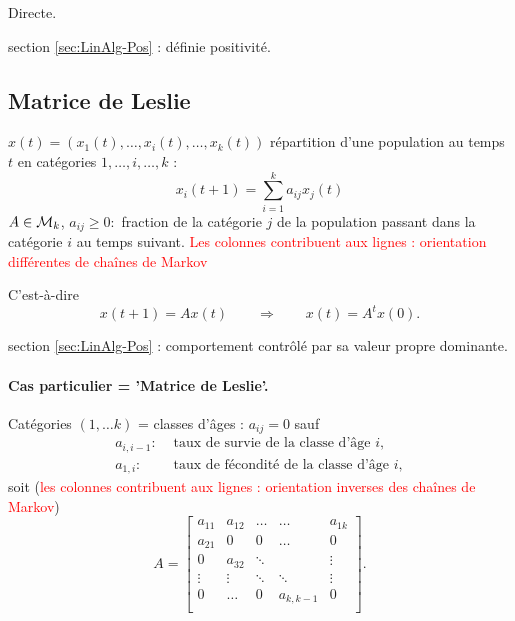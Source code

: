 \proof Directe. \eproof

\remark section \ref{sec:LinAlg-Pos} : définie positivité.

\subsection{Matrice de Leslie}  \label{sec:MatLeslie}

$x(t) = (x_1(t), \dots, x_i(t), \dots, x_k(t))$ répartition d'une population au temps $t$ en catégories $1, \dots, i, \dots, k$ :
$$
x_i(t+1) = \sum_{i=1}^k a_{ij} x_j(t) 
$$
$A \in \mathcal{M}_k$, $a_{ij} \geq 0 : $ fraction de la catégorie $j$ de la population passant dans la catégorie $i$ au temps suivant. \textcolor{red}{Les colonnes contribuent aux lignes : orientation différentes de chaînes de Markov}

C'est-à-dire
$$
x(t+1) = A x(t) 
\qquad \Rightarrow \qquad 
x(t) = A^t x(0).
$$

\remark section \ref{sec:LinAlg-Pos} : comportement contrôlé par sa valeur propre dominante.

\paragraph{Cas particulier = 'Matrice de Leslie'.}

Catégories $(1, \dots k)$ = classes d'âges : $a_{ij} = 0$ sauf 
\begin{align*}
  a_{i, i-1} : & \text{ taux de survie de la classe d'âge $i$}, \\
  a_{1, i} : & \text{ taux de fécondité de la classe d'âge $i$}, 
\end{align*}
soit (\textcolor{red}{les colonnes contribuent aux lignes : orientation inverses des chaînes de Markov})
$$
A = \left[\begin{array}{cccccc}
            a_{11} & a_{12} & \dots  & \dots & a_{1k} \\
            a_{21} & 0 & 0  & \dots & 0 \\
            0 & a_{32} & \ddots & & \vdots \\
            \vdots & \vdots & \ddots & \ddots & \vdots \\
            0 & \dots & 0 & a_{k, k-1} & 0 \\
          \end{array}\right].
$$


